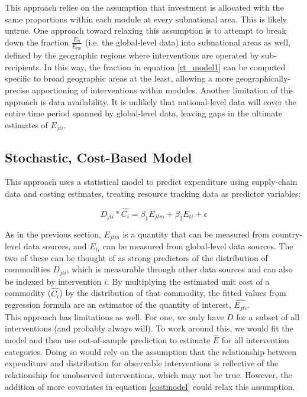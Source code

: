 \documentclass[twocolumn]{bmcart}%
\begin{document}
This approach relies on the assumption that investment is allocated with the same proportions within each module at every subnational area. This is likely untrue. One approach toward relaxing this assumption is to attempt to break down the fraction $\frac{E_{ti}}{E_{tm}}$ (i.e. the global-level data) into subnational areas as well, defined by the geographic regions where interventions are operated by sub-recipients. In this way, the fraction in equation \ref{rt_model1} can be computed specific to broad geographic areas at the least, allowing a more geographically-precise apportioning of interventions within modules. Another limitation of this approach is data availability. It is unlikely that national-level data will cover the entire time period spanned by global-level data, leaving gaps in the ultimate estimates of $E_{jti}$.

\subsection{Stochastic, Cost-Based Model}

This approach uses a statistical model to predict expenditure using supply-chain data and costing estimates, treating resource tracking data as predictor variables:

\begin{equation}
  \label{costmodel}
  D_{jti} * \widehat{C_i} = \beta_1 E_{jtm} + \beta_2 E_{ti} + \epsilon
\end{equation}

As in the previous section, $E_{jtm}$ is a quantity that can be measured from country-level data sources, and $E_{ti}$ can be measured from global-level data sources. The two of these can be thought of as strong predictors of the distribution of commodities $D_{jti}$, which is measurable through other data sources and can also be indexed by intervention $i$. By multiplying the estimated unit cost of a commodity ($\widehat{C_i}$) by the distribution of that commodity, the fitted values from regression formula are an estimator of the quantity of interest, $\widehat{E_{jti}}$. \\

This approach has limitations as well. For one, we only have $D$ for a subset of all interventions (and probably always will). To work around this, we would fit the model and then use out-of-sample prediction to estimate $\hat{E}$ for all intervention categories. Doing so would rely on the assumption that the relationship between expenditure and distribution for observable interventions is reflective of the relationship for unobserved interventions, which may not be true. However, the addition of more covariates in equation \ref{costmodel} could relax this assumption.
\end{document}
